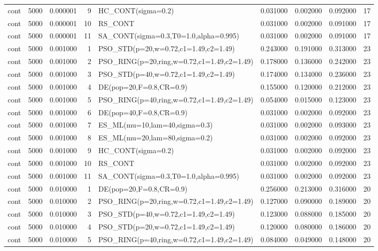 \begin{longtable}{lrrrlrrrr}
cont & 5000 & 0.000001 & 9 & HC\_CONT(sigma=0.2) & 0.031000 & 0.002000 & 0.092000 & 17 \\
cont & 5000 & 0.000001 & 10 & RS\_CONT & 0.031000 & 0.002000 & 0.091000 & 17 \\
cont & 5000 & 0.000001 & 11 & SA\_CONT(sigma=0.3,T0=1.0,alpha=0.995) & 0.031000 & 0.002000 & 0.091000 & 17 \\
cont & 5000 & 0.001000 & 1 & PSO\_STD(p=20,w=0.72,c1=1.49,c2=1.49) & 0.243000 & 0.191000 & 0.313000 & 23 \\
cont & 5000 & 0.001000 & 2 & PSO\_RING(p=20,ring,w=0.72,c1=1.49,c2=1.49) & 0.178000 & 0.136000 & 0.242000 & 23 \\
cont & 5000 & 0.001000 & 3 & PSO\_STD(p=40,w=0.72,c1=1.49,c2=1.49) & 0.174000 & 0.134000 & 0.236000 & 23 \\
cont & 5000 & 0.001000 & 4 & DE(pop=20,F=0.8,CR=0.9) & 0.155000 & 0.120000 & 0.212000 & 23 \\
cont & 5000 & 0.001000 & 5 & PSO\_RING(p=40,ring,w=0.72,c1=1.49,c2=1.49) & 0.054000 & 0.015000 & 0.123000 & 23 \\
cont & 5000 & 0.001000 & 6 & DE(pop=40,F=0.8,CR=0.9) & 0.031000 & 0.002000 & 0.092000 & 23 \\
cont & 5000 & 0.001000 & 7 & ES\_ML(mu=10,lam=40,sigma=0.3) & 0.031000 & 0.002000 & 0.093000 & 23 \\
cont & 5000 & 0.001000 & 8 & ES\_ML(mu=20,lam=80,sigma=0.2) & 0.031000 & 0.002000 & 0.092000 & 23 \\
cont & 5000 & 0.001000 & 9 & HC\_CONT(sigma=0.2) & 0.031000 & 0.002000 & 0.092000 & 23 \\
cont & 5000 & 0.001000 & 10 & RS\_CONT & 0.031000 & 0.002000 & 0.092000 & 23 \\
cont & 5000 & 0.001000 & 11 & SA\_CONT(sigma=0.3,T0=1.0,alpha=0.995) & 0.031000 & 0.002000 & 0.092000 & 23 \\
cont & 5000 & 0.010000 & 1 & DE(pop=20,F=0.8,CR=0.9) & 0.256000 & 0.213000 & 0.316000 & 20 \\
cont & 5000 & 0.010000 & 2 & PSO\_RING(p=20,ring,w=0.72,c1=1.49,c2=1.49) & 0.127000 & 0.090000 & 0.189000 & 20 \\
cont & 5000 & 0.010000 & 3 & PSO\_STD(p=40,w=0.72,c1=1.49,c2=1.49) & 0.123000 & 0.088000 & 0.185000 & 20 \\
cont & 5000 & 0.010000 & 4 & PSO\_STD(p=20,w=0.72,c1=1.49,c2=1.49) & 0.120000 & 0.080000 & 0.186000 & 20 \\
cont & 5000 & 0.010000 & 5 & PSO\_RING(p=40,ring,w=0.72,c1=1.49,c2=1.49) & 0.084000 & 0.049000 & 0.148000 & 20 \\

\end{longtable}
